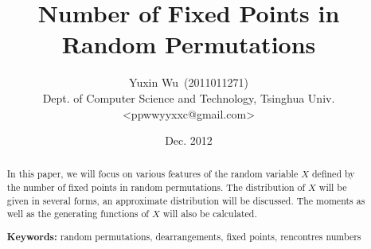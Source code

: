\documentclass[a4paper]{article}
\title{Number of Fixed Points in Random Permutations}
\author{Yuxin Wu~(2011011271)\\Dept. of Computer Science and Technology, Tsinghua Univ.\\<ppwwyyxxc@gmail.com>}
\date{Dec. 2012}
\begin{document}
\maketitle
\begin{abstract}
  In this paper, we will focus on various features of the random variable $X$
  defined by the number of fixed points in random permutations.
  The distribution of $X$ will be given in several forms, an approximate distribution will be discussed.
  The moments as well as the generating functions of $X$ will also be calculated.

  \textbf{Keywords:} random permutations, dearrangements, fixed points, rencontres numbers
\end{abstract}
\tableofcontents
\newpage







\nocite{inverse}
\nocite{set}
\nocite{bigbook}
\nocite{feller}
\nocite{textbook}
%
\printbibliography
\end{document}
